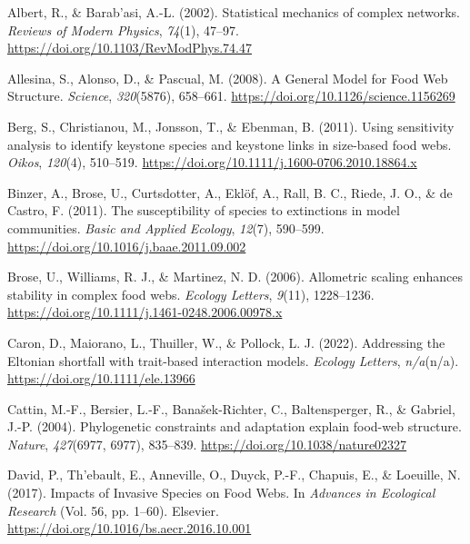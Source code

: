 \documentclass{article}
\newlength{\cslhangindent}
\newlength{\cslentryspacingunit} %
\newenvironment{CSLReferences}[2] %
 {%
  \setlength{\parindent}{0pt}
  \ifodd #1
  \let\oldpar\par
  \def\par{\hangindent=\cslhangindent\oldpar}
  \fi
  \setlength{\parskip}{#2\cslentryspacingunit}
 }%
 {}
\begin{document}
\hypertarget{refs}{}
\begin{CSLReferences}{1}{0}
\leavevmode{}%
Albert, R., \& Barab'asi, A.-L. (2002). Statistical mechanics of complex
networks. \emph{Reviews of Modern Physics}, \emph{74}(1), 47--97.
\url{https://doi.org/10.1103/RevModPhys.74.47}

\leavevmode{}%
Allesina, S., Alonso, D., \& Pascual, M. (2008). A {General Model} for
{Food Web Structure}. \emph{Science}, \emph{320}(5876), 658--661.
\url{https://doi.org/10.1126/science.1156269}

\leavevmode{}%
Berg, S., Christianou, M., Jonsson, T., \& Ebenman, B. (2011). Using
sensitivity analysis to identify keystone species and keystone links in
size-based food webs. \emph{Oikos}, \emph{120}(4), 510--519.
\url{https://doi.org/10.1111/j.1600-0706.2010.18864.x}

\leavevmode{}%
Binzer, A., Brose, U., Curtsdotter, A., Eklöf, A., Rall, B. C., Riede,
J. O., \& de Castro, F. (2011). The susceptibility of species to
extinctions in model communities. \emph{Basic and Applied Ecology},
\emph{12}(7), 590--599. \url{https://doi.org/10.1016/j.baae.2011.09.002}

\leavevmode{}%
Brose, U., Williams, R. J., \& Martinez, N. D. (2006). Allometric
scaling enhances stability in complex food webs. \emph{Ecology Letters},
\emph{9}(11), 1228--1236.
\url{https://doi.org/10.1111/j.1461-0248.2006.00978.x}

\leavevmode{}%
Caron, D., Maiorano, L., Thuiller, W., \& Pollock, L. J. (2022).
Addressing the {Eltonian} shortfall with trait-based interaction models.
\emph{Ecology Letters}, \emph{n/a}(n/a).
\url{https://doi.org/10.1111/ele.13966}

\leavevmode{}%
Cattin, M.-F., Bersier, L.-F., Banašek-Richter, C., Baltensperger, R.,
\& Gabriel, J.-P. (2004). Phylogenetic constraints and adaptation
explain food-web structure. \emph{Nature}, \emph{427}(6977, 6977),
835--839. \url{https://doi.org/10.1038/nature02327}

\leavevmode{}%
David, P., Th'ebault, E., Anneville, O., Duyck, P.-F., Chapuis, E., \&
Loeuille, N. (2017). Impacts of {Invasive Species} on {Food Webs}. In
\emph{Advances in {Ecological Research}} (Vol. 56, pp. 1--60).
{Elsevier}. \url{https://doi.org/10.1016/bs.aecr.2016.10.001}


\end{CSLReferences}
\end{document}
